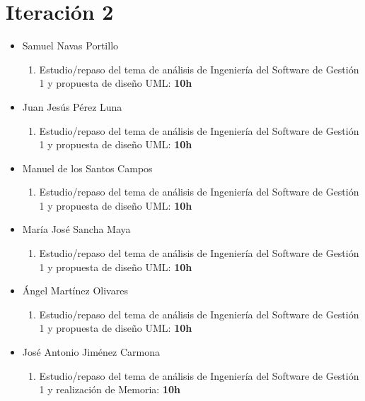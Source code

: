 \documentclass[11 pt]{book}
\begin{document}
		\section*{Iteración 2}
		    \begin{itemize}
			    \item Samuel Navas Portillo
				    \begin{enumerate}
					    \item Estudio/repaso del tema de análisis de Ingeniería del Software de Gestión 1 y propuesta de diseño UML: \textbf{10h}
				    \end{enumerate}
			    \item Juan Jesús Pérez Luna
				    \begin{enumerate}
					    \item Estudio/repaso del tema de análisis de Ingeniería del Software de Gestión 1 y propuesta de diseño UML: \textbf{10h}
				    \end{enumerate}
			    \item Manuel de los Santos Campos
				    \begin{enumerate}
					    \item Estudio/repaso del tema de análisis de Ingeniería del Software de Gestión 1 y propuesta de diseño UML: \textbf{10h}
				    \end{enumerate}
			    \item María José Sancha Maya
				    \begin{enumerate}
					    \item Estudio/repaso del tema de análisis de Ingeniería del Software de Gestión 1 y propuesta de diseño UML: \textbf{10h}
				    \end{enumerate}
			    \item Ángel Martínez Olivares
				    \begin{enumerate}
					    \item Estudio/repaso del tema de análisis de Ingeniería del Software de Gestión 1 y propuesta de diseño UML: \textbf{10h}
				    \end{enumerate}
			    \item José Antonio Jiménez Carmona
				    \begin{enumerate}
					    \item Estudio/repaso del tema de análisis de Ingeniería del Software de Gestión 1 y realización de Memoria: \textbf{10h}
				    \end{enumerate}
		    \end{itemize}
		
\end{document}
